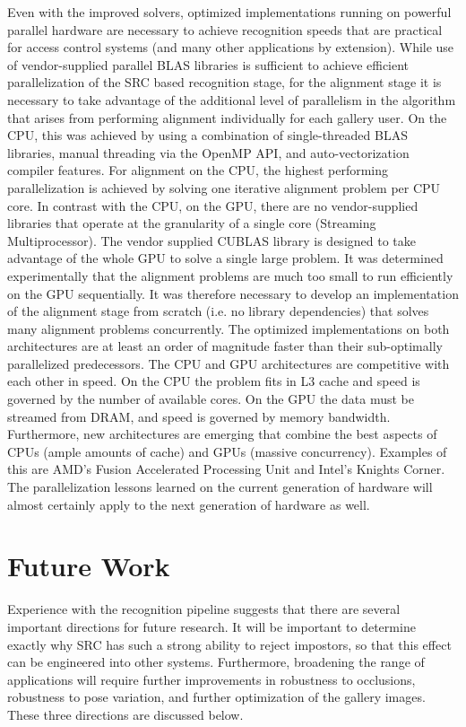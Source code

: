 Even with the improved solvers, optimized implementations running on powerful
parallel hardware are necessary to achieve recognition speeds that are
practical for access control systems (and many other applications by
extension).  While use of vendor-supplied parallel BLAS libraries is sufficient
to achieve efficient parallelization of the SRC based recognition stage, for
the alignment stage it is necessary to take advantage of the additional level
of parallelism in the algorithm that arises from performing alignment
individually for each gallery user.  On the CPU, this was achieved by using a
combination of single-threaded BLAS libraries, manual threading via the OpenMP
API, and auto-vectorization compiler features.  For alignment on the CPU, the
highest performing parallelization is achieved by solving one iterative
alignment problem per CPU core.  In contrast with the CPU, on the GPU, there
are no vendor-supplied libraries that operate at the granularity of a single
core (Streaming Multiprocessor).  The vendor supplied CUBLAS library is
designed to take advantage of the whole GPU to solve a single large problem.
It was determined experimentally that the alignment problems are much too small
to run efficiently on the GPU sequentially. It was therefore necessary to
develop an implementation of the alignment stage from scratch (i.e. no library
dependencies) that solves many alignment problems concurrently.  The optimized
implementations on both architectures are at least an order of magnitude faster
than their sub-optimally parallelized predecessors.  The CPU and GPU
architectures are competitive with each other in speed.  On the CPU the problem
fits in L3 cache and speed is governed by the number of available cores.  On
the GPU the data must be streamed from DRAM, and speed is governed by memory
bandwidth.  Furthermore, new architectures are emerging that combine the best
aspects of CPUs (ample amounts of cache) and GPUs (massive concurrency).
Examples of this are AMD's Fusion Accelerated Processing Unit and Intel's
Knights Corner.  The parallelization lessons learned on the current generation
of hardware will almost certainly apply to the next generation of hardware as
well.

\section{Future Work} Experience with the recognition pipeline suggests that there are
several important directions for future research.  It will be important to
determine exactly why SRC has such a strong ability to reject impostors, so
that this effect can be engineered into other systems.  Furthermore, broadening
the range of applications will require further improvements in robustness to
occlusions, robustness to pose variation, and further optimization of the
gallery images.  These three directions are discussed below.  

